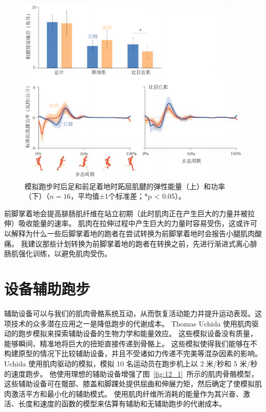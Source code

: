 \begin{figure}[!htb]
	\centering
	\includegraphics[width=1.0\linewidth]{chap12/12_11}
	\caption{模拟跑步时后足和前足着地时跖屈肌腱的弹性能量（上）和功率（下）（$n = 16$，平均值±1个标准差；*p < 0.05）\cite{yong2020foot}。\label{fig:12_11}}
\end{figure}


前脚掌着地会提高腓肠肌纤维在站立初期（此时肌肉正在产生巨大的力量并被拉伸）吸收能量的速率。
肌肉在拉伸过程中产生巨大的力量时容易受伤，这或许可以解释为什么一些后脚掌着地的跑者在尝试转换为前脚掌着地时会报告小腿肌肉酸痛。
我建议那些计划转换为前脚掌着地的跑者在转换之前，先进行渐进式离心腓肠肌强化训练，以避免肌肉受伤。


\section{设备辅助跑步}

辅助设备可以与我们的肌肉骨骼系统互动，从而恢复活动能力并提升运动表现。这项技术的众多潜在应用之一是降低跑步的代谢成本。
Thomas Uchida 使用肌肉驱动的跑步模拟来探索辅助设备的生物力学和能量效应\cite{uchida2016simulating}。
这些模拟设备没有质量，能够瞬间、精准地将巨大的扭矩直接传递到骨骼上。
这些模拟使得我们能够在不构建原型的情况下比较辅助设备，并且不受诸如力传递不完美等混杂因素的影响。
Uchida 使用肌肉驱动的模拟，模拟 10 名运动员在跑步机上以 2 米/秒和 5 米/秒的速度跑步。
他使用理想的辅助设备增强了图~\ref{fig:12_1}~所示的肌肉骨骼模型，这些辅助设备可在髋部、膝盖和脚踝处提供屈曲和伸展力矩，然后确定了使模拟肌肉激活平方和最小化的辅助模式。
使用肌肉纤维所消耗的能量作为其兴奋、激活、长度和速度的函数的模型来估算有辅助和无辅助跑步的代谢成本\cite{umberger2003model,uchida2016simulating}。


